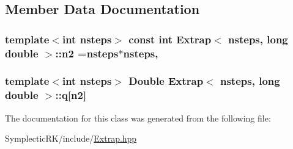 \subsection{Member Data Documentation}
\hypertarget{classExtrap_3_01nsteps_00_01long_01double_01_4_a55ea56303a421b8b26a3260b815e7b62}{
\subsubsection[{n2}]{\setlength{\rightskip}{0pt plus 5cm}template$<$int nsteps$>$ const int {\bf Extrap}$<$ nsteps, long double $>$\-::n2 =nsteps$\ast$nsteps\hspace{0.3cm}{\ttfamily [static]}, {\ttfamily [private]}}}\label{classExtrap_3_01nsteps_00_01long_01double_01_4_a55ea56303a421b8b26a3260b815e7b62}
\hypertarget{classExtrap_3_01nsteps_00_01long_01double_01_4_acde9ea9e7183d0f054fb4e8ee461ddfa}{
\subsubsection[{q}]{\setlength{\rightskip}{0pt plus 5cm}template$<$int nsteps$>$ {\bf Double} {\bf Extrap}$<$ nsteps, long double $>$\-::q\mbox{[}{\bf n2}\mbox{]}\hspace{0.3cm}{\ttfamily [protected]}}}\label{classExtrap_3_01nsteps_00_01long_01double_01_4_acde9ea9e7183d0f054fb4e8ee461ddfa}


The documentation for this class was generated from the following file\-:\begin{DoxyCompactItemize}
\item 
Symplectic\-R\-K/include/\hyperlink{Extrap_8hpp}{Extrap.\-hpp}\end{DoxyCompactItemize}
